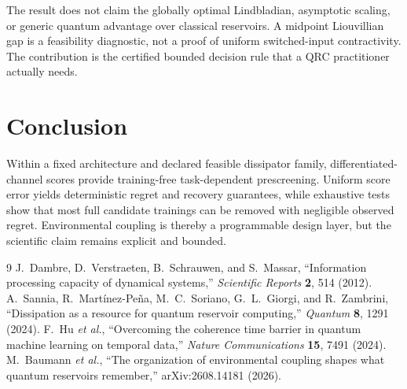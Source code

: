 \documentclass[a4paper,twocolumn,11pt,unpublished]{quantumarticle}
\begin{document}
The result does not claim the globally optimal Lindbladian, asymptotic scaling,
or generic quantum advantage over classical reservoirs. A midpoint Liouvillian
gap is a feasibility diagnostic, not a proof of uniform switched-input
contractivity. The contribution is the certified bounded decision rule that a
QRC practitioner actually needs.

\section{Conclusion}
Within a fixed architecture and declared feasible dissipator family,
differentiated-channel scores provide training-free task-dependent
prescreening. Uniform score error yields deterministic regret and recovery
guarantees, while exhaustive tests show that most full candidate trainings can
be removed with negligible observed regret. Environmental coupling is thereby
a programmable design layer, but the scientific claim remains explicit and
bounded.

\begin{thebibliography}{9}
 J.~Dambre, D.~Verstraeten, B.~Schrauwen, and S.~Massar,
``Information processing capacity of dynamical systems,'' \emph{Scientific
Reports} \textbf{2}, 514 (2012).
 A.~Sannia, R.~Mart\'inez-Pe\~na, M.~C.~Soriano,
G.~L.~Giorgi, and R.~Zambrini, ``Dissipation as a resource for quantum
reservoir computing,'' \emph{Quantum} \textbf{8}, 1291 (2024).
 F.~Hu \emph{et al.}, ``Overcoming the coherence time barrier in
quantum machine learning on temporal data,'' \emph{Nature Communications}
\textbf{15}, 7491 (2024).
 M.~Baumann \emph{et al.}, ``The organization of
environmental coupling shapes what quantum reservoirs remember,''
arXiv:2608.14181 (2026).
\end{thebibliography}
\end{document}
